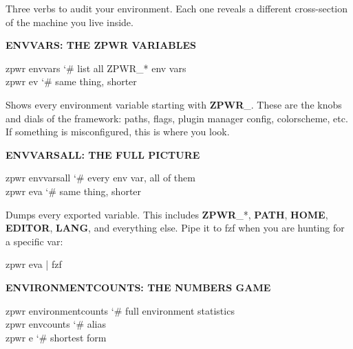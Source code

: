 \documentclass[11pt,a4paper,twoside]{book}
\begin{document}
Three verbs to audit your environment. Each one reveals a different cross-section of the machine you live inside.


\vspace{12pt}
{\bfseries\color{neonyellow} ENVVARS: THE \textbf{ZPWR} VARIABLES}\vspace{4pt}

\begin{codebox}
\color{neongreen}zpwr envvars                        {\char`\#} list all ZPWR\_* env vars\\
\color{neongreen}zpwr ev                              {\char`\#} same thing, shorter\\
\end{codebox}

Shows every environment variable starting with \textbf{ZPWR}\_. These are the knobs and dials of the framework: paths, flags, plugin manager config, colorscheme, etc. If something is misconfigured, this is where you look.


\vspace{12pt}
{\bfseries\color{neonyellow} ENVVARSALL: THE FULL PICTURE}\vspace{4pt}

\begin{codebox}
\color{neongreen}zpwr envvarsall                     {\char`\#} every env var, all of them\\
\color{neongreen}zpwr eva                             {\char`\#} same thing, shorter\\
\end{codebox}

Dumps every exported variable. This includes \textbf{ZPWR}\_*, \textbf{PATH}, \textbf{HOME}, \textbf{EDITOR}, \textbf{LANG}, and everything else. Pipe it to fzf when you are hunting for a specific var:

\begin{codebox}
\color{neongreen}zpwr eva | fzf\\
\end{codebox}


\vspace{12pt}
{\bfseries\color{neonyellow} ENVIRONMENTCOUNTS: THE NUMBERS GAME}\vspace{4pt}

\begin{codebox}
\color{neongreen}zpwr environmentcounts              {\char`\#} full environment statistics\\
\color{neongreen}zpwr envcounts                      {\char`\#} alias\\
\color{neongreen}zpwr e                               {\char`\#} shortest form\\
\end{codebox}
\end{document}
